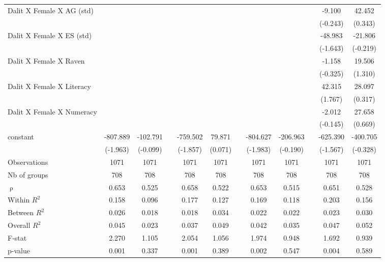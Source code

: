 {\begin{longtable}{@{\extracolsep{\fill}}lccccccccccc}
    Dalit X Female X AG (std) &   &   &   &   &   &   &   &   &   & -9.100 & 42.452 \\
      &   &   &   &   &   &   &   &   &   & (-0.243) & (0.343) \\
    Dalit X Female X ES (std) &   &   &   &   &   &   &   &   &   & -48.983 & -21.806 \\
      &   &   &   &   &   &   &   &   &   & (-1.643) & (-0.219) \\
    Dalit X Female X Raven &   &   &   &   &   &   &   &   &   & -1.158 & 19.506 \\
      &   &   &   &   &   &   &   &   &   & (-0.325) & (1.310) \\
    Dalit X Female X Literacy &   &   &   &   &   &   &   &   &   & 42.315 & 28.097 \\
      &   &   &   &   &   &   &   &   &   & (1.767) & (0.317) \\
    Dalit X Female X Numeracy &   &   &   &   &   &   &   &   &   & -2.012 & 27.658 \\
      &   &   &   &   &   &   &   &   &   & (-0.145) & (0.669) \\
    constant & -807.889 & -102.791 &   & -759.502 & 79.871 &   & -804.627 & -206.963 &   & -625.390 & -400.705 \\
      & (-1.963) & (-0.099) &   & (-1.857) & (0.071) &   & (-1.983) & (-0.190) &   & (-1.567) & (-0.328) \\
    \midrule
    Observations & 1071 & 1071 &   & 1071 & 1071 &   & 1071 & 1071 &   & 1071 & 1071 \\
    Nb of groups & 708 & 708 &   & 708 & 708 &   & 708 & 708 &   & 708 & 708 \\
    $\uprho$ & 0.653 & 0.525 &   & 0.658 & 0.522 &   & 0.653 & 0.515 &   & 0.651 & 0.528 \\
    Within $R^2$ & 0.158 & 0.096 &   & 0.177 & 0.127 &   & 0.169 & 0.118 &   & 0.203 & 0.156 \\
    Between $R^2$ & 0.026 & 0.018 &   & 0.018 & 0.034 &   & 0.022 & 0.022 &   & 0.023 & 0.030 \\
    Overall $R^2$ & 0.045 & 0.023 &   & 0.037 & 0.049 &   & 0.042 & 0.035 &   & 0.047 & 0.052 \\
    F-stat & 2.270 & 1.105 &   & 2.054 & 1.056 &   & 1.974 & 0.948 &   & 1.692 & 0.939 \\
    p-value & 0.001 & 0.337 &   & 0.001 & 0.389 &   & 0.002 & 0.547 &   & 0.004 & 0.589 \\
    \bottomrule
    \end{longtable}%
}